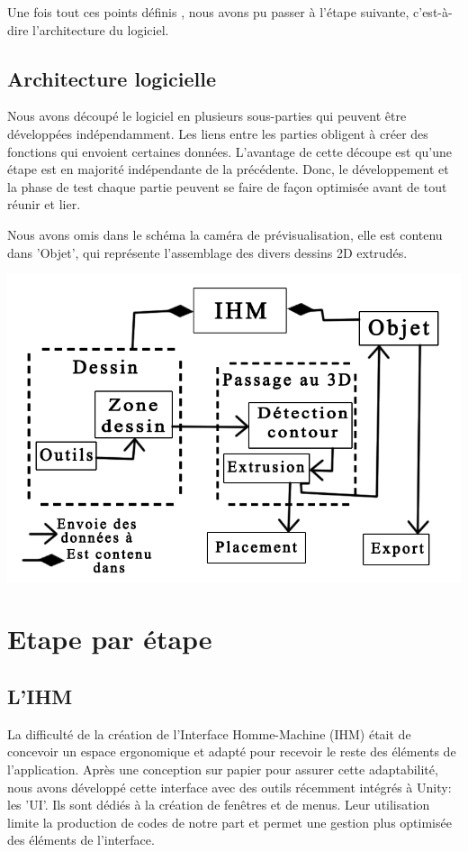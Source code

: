 \documentclass[a4paper,11pt]{article}
\begin{document}
		Une fois tout ces points définis , nous avons pu passer à l'étape suivante, c'est-à-dire l'architecture du logiciel.
		
		\subsection{Architecture logicielle} %
		Nous avons découpé le logiciel en plusieurs sous-parties qui peuvent être développées indépendamment. Les liens entre les parties obligent à créer des fonctions qui envoient certaines données. L'avantage de cette découpe est qu'une étape est en majorité indépendante de la précédente. Donc, le développement et la phase de test chaque partie peuvent se faire de façon optimisée avant de tout réunir et lier.
		
		Nous avons omis dans le schéma la caméra de prévisualisation, elle est contenu dans 'Objet', qui représente l'assemblage des divers dessins 2D extrudés.
				\centerline{\includegraphics[scale=0.5]{images/archi.png}}


	\section{Etape par étape}
		\subsection{L'IHM} %
			La difficulté de la création de l'Interface Homme-Machine (IHM) était de concevoir un espace ergonomique et adapté pour recevoir le reste des éléments de l'application. Après une conception sur papier pour assurer cette adaptabilité, nous avons développé cette interface avec des outils récemment intégrés à Unity: les 'UI'. Ils sont dédiés à la création de fenêtres et de menus. Leur utilisation limite la production de codes de notre part et permet une gestion plus optimisée des éléments de l'interface.
			
\end{document}
